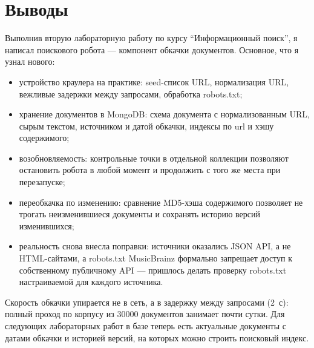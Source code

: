 \section{Выводы}
Выполнив вторую лабораторную работу по курсу \enquote{Информационный поиск}, я
написал поискового робота --- компонент обкачки документов. Основное, что я
узнал нового:

\begin{itemize}
    \item устройство краулера на практике: seed-список URL, нормализация URL,
    вежливые задержки между запросами, обработка robots.txt;
    \item хранение документов в MongoDB: схема документа с нормализованным
    URL, сырым текстом, источником и датой обкачки, индексы по url и хэшу
    содержимого;
    \item возобновляемость: контрольные точки в отдельной коллекции позволяют
    остановить робота в любой момент и продолжить с того же места при
    перезапуске;
    \item переобкачка по изменению: сравнение MD5-хэша содержимого позволяет
    не трогать неизменившиеся документы и сохранять историю версий изменившихся;
    \item реальность снова внесла поправки: источники оказались JSON API, а не
    HTML-сайтами, а robots.txt MusicBrainz формально запрещает доступ к
    собственному публичному API --- пришлось делать проверку robots.txt
    настраиваемой для каждого источника.
\end{itemize}

Скорость обкачки упирается не в сеть, а в задержку между запросами (2~с):
полный проход по корпусу из 30000 документов занимает почти сутки. Для
следующих лабораторных работ в базе теперь есть актуальные документы с датами
обкачки и историей версий, на которых можно строить поисковый индекс.

\pagebreak
